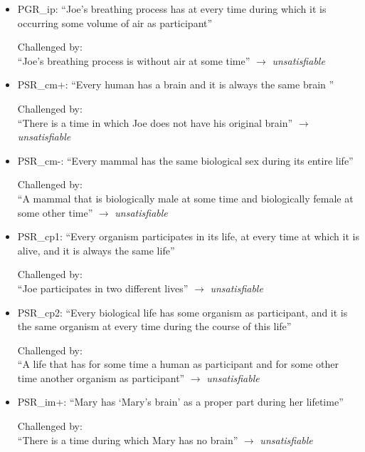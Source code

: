 \begin{itemize}
\item PGR\_ip:  ``Joe's breathing process has at every time during which it is occurring some volume of air as participant''

Challenged by: \\``Joe's breathing process is without air at some time''  
$\rightarrow$ \emph{unsatisfiable}


\item PSR\_cm+: ``Every human has a brain and it is always the same brain ''

Challenged by: \\``There is a time in which Joe does not have his original brain''  
$\rightarrow$ \emph{unsatisfiable}



\item PSR\_cm-: ``Every mammal has the same biological sex during its entire life''

Challenged by: \\``A mammal that is biologically male at some time and biologically female at some other time''  
$\rightarrow$ \emph{unsatisfiable}

 
\item PSR\_cp1: ``Every organism participates in its life, at every time at which it is alive, and it is always the same life''

Challenged by: \\``Joe participates in two different lives''  
$\rightarrow$ \emph{unsatisfiable}


\item PSR\_cp2: ``Every biological life has some organism as participant, and it is the same organism at every time during the course of this life''

Challenged by: \\``A life that has for some time a human as participant and for some other time another organism as participant''  
$\rightarrow$ \emph{unsatisfiable}


\item PSR\_im+: ``Mary has `Mary's brain' as a proper part during her lifetime''

Challenged by: \\``There is a time during which Mary has no brain''  
$\rightarrow$ \emph{unsatisfiable}



\end{itemize}
